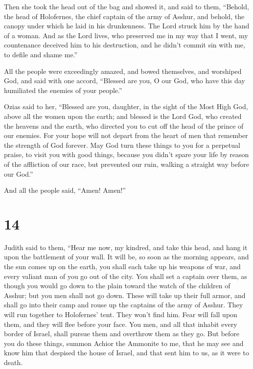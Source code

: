  Then she took the head out of the bag and showed it, and
said to them, ``Behold, the head of Holofernes, the chief captain of the
army of Asshur, and behold, the canopy under which he laid in his
drunkenness. The Lord struck him by the hand of a woman. 
And as the Lord lives, who preserved me in my way that I went, my
countenance deceived him to his destruction, and he didn't commit sin
with me, to defile and shame me.''

 All the people were exceedingly amazed, and bowed
themselves, and worshiped God, and said with one accord, ``Blessed are
you, O our God, who have this day humiliated the enemies of your
people.''

 Ozias said to her, ``Blessed are you, daughter, in the
sight of the Most High God, above all the women upon the earth; and
blessed is the Lord God, who created the heavens and the earth, who
directed you to cut off the head of the prince of our enemies.
 For your hope will not depart from the heart of men that
remember the strength of God forever.  May God turn these
things to you for a perpetual praise, to visit you with good things,
because you didn't spare your life by reason of the affliction of our
race, but prevented our ruin, walking a straight way before our God.''

And all the people said, ``Amen! Amen!''

\hypertarget{section-13}{%
\section{14}\label{section-13}}

 Judith said to them, ``Hear me now, my kindred, and take
this head, and hang it upon the battlement of your wall.  It
will be, so soon as the morning appears, and the sun comes up on the
earth, you shall each take up his weapons of war, and every valiant man
of you go out of the city. You shall set a captain over them, as though
you would go down to the plain toward the watch of the children of
Asshur; but you men shall not go down.  These will take up
their full armor, and shall go into their camp and rouse up the captains
of the army of Asshur. They will run together to Holofernes' tent. They
won't find him. Fear will fall upon them, and they will flee before your
face.  You men, and all that inhabit every border of Israel,
shall pursue them and overthrow them as they go.  But before
you do these things, summon Achior the Ammonite to me, that he may see
and know him that despised the house of Israel, and that sent him to us,
as it were to death.

